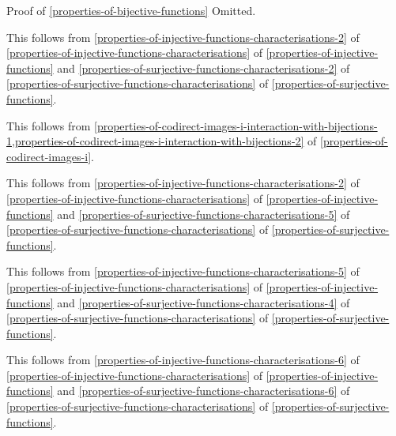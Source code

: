 \begin{Proof}{Proof of \cref{properties-of-bijective-functions}}
    Omitted.

    This follows from \cref{properties-of-injective-functions-characterisations-2} of \cref{properties-of-injective-functions-characterisations} of \cref{properties-of-injective-functions} and \cref{properties-of-surjective-functions-characterisations-2} of \cref{properties-of-surjective-functions-characterisations} of \cref{properties-of-surjective-functions}.

    This follows from \cref{properties-of-codirect-images-i-interaction-with-bijections-1,properties-of-codirect-images-i-interaction-with-bijections-2} of \cref{properties-of-codirect-images-i}.

    This follows from \cref{properties-of-injective-functions-characterisations-2} of \cref{properties-of-injective-functions-characterisations} of \cref{properties-of-injective-functions} and \cref{properties-of-surjective-functions-characterisations-5} of \cref{properties-of-surjective-functions-characterisations} of \cref{properties-of-surjective-functions}.

    This follows from \cref{properties-of-injective-functions-characterisations-5} of \cref{properties-of-injective-functions-characterisations} of \cref{properties-of-injective-functions} and \cref{properties-of-surjective-functions-characterisations-4} of \cref{properties-of-surjective-functions-characterisations} of \cref{properties-of-surjective-functions}.

    This follows from \cref{properties-of-injective-functions-characterisations-6} of \cref{properties-of-injective-functions-characterisations} of \cref{properties-of-injective-functions} and \cref{properties-of-surjective-functions-characterisations-6} of \cref{properties-of-surjective-functions-characterisations} of \cref{properties-of-surjective-functions}.


\end{Proof}
